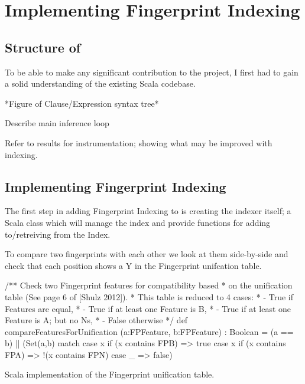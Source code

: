 
\chapter{Implementing Fingerprint Indexing}
\label{cha:method}

\section{Structure of \beagle}
\label{sec:initial}

To be able to make any significant contribution to the \beagle  project, I first
had to gain a solid understanding of the existing Scala codebase.

*Figure of Clause/Expression syntax tree*

Describe main inference loop

Refer to results for instrumentation; showing what may be improved with indexing.

\section{Implementing Fingerprint Indexing}
\label{sec:initial}

The first step in adding Fingerprint Indexing to \beagle is creating the indexer
itself; a Scala class which will manage the index and provide functions for adding
to/retreiving from the Index. 

To compare two fingerprints with each other we look at them side-by-side and check
that each position shows a Y in the Fingerprint unifcation table. 
\begin{listing}[H]
\begin{scalacode}
 /** Check two Fingerprint features for compatibility based
   * on the unification table (See page 6 of [Shulz 2012]).
   * This table is reduced to 4 cases:
   *  - True if Features are equal,
   *  - True if at least one Feature is B,
   *  - True if at least one Feature is A; but no Ns,
   *  - False otherwise  */
  def compareFeaturesForUnification
         (a:FPFeature, b:FPFeature) : Boolean =
  (a == b) || 
  (Set(a,b) match {
    case x if (x contains FPB) => true
    case x if (x contains FPA) => !(x contains FPN)
    case _ => false})
\end{scalacode}
\caption{Scala implementation of the Fingerprint unification table. \protect\cite[p6]{shulz12}}
\label{lst:unitable}
\end{listing}

